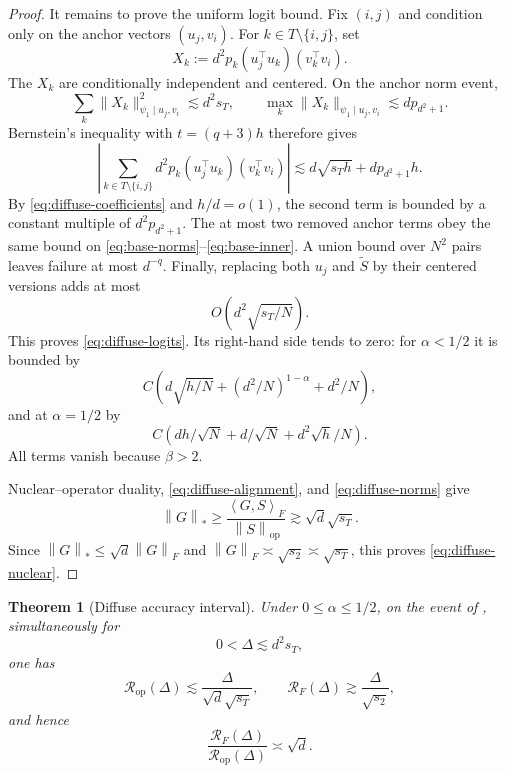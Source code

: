 \documentclass[11pt]{article}
\newtheorem{theorem}{Theorem}[section]
\theoremstyle{definition}
\newcommand{\ip}[2]{\left\langle #1,#2\right\rangle_F}
\newcommand{\normF}[1]{\left\lVert #1\right\rVert_F}
\newcommand{\normop}[1]{\left\lVert #1\right\rVert_{\mathrm{op}}}
\newcommand{\normnuc}[1]{\left\lVert #1\right\rVert_*}
\begin{document}
\begin{proof}
It remains to prove the uniform logit bound.  Fix $(i,j)$ and condition
only on the anchor vectors $(u_j,v_i)$.  For
$k\in T\setminus\{i,j\}$, set
\[
 X_k:=d^2p_k(u_j^\top u_k)(v_k^\top v_i).
\]
The $X_k$ are conditionally independent and centered.  On the anchor
norm event,
\[
 \sum_k\|X_k\|_{\psi_1\mid u_j,v_i}^2\lesssim d^2s_T,
 \qquad
 \max_k\|X_k\|_{\psi_1\mid u_j,v_i}
 \lesssim dp_{d^2+1}.
\]  Bernstein's
inequality with $t=(q+3)h$ therefore gives
\[
 \left|\sum_{k\in T\setminus\{i,j\}}
 d^2p_k(u_j^\top u_k)(v_k^\top v_i)\right|
 \lesssim d\sqrt{s_Th}+d p_{d^2+1}h.
\]
By \eqref{eq:diffuse-coefficients} and $h/d=o(1)$, the second term is
bounded by a constant multiple of $d^2p_{d^2+1}$.  The at most two
removed anchor terms obey the same bound on
\eqref{eq:base-norms}--\eqref{eq:base-inner}.  A union bound over
$N^2$ pairs leaves failure at most $d^{-q}$.  Finally, replacing both
$u_j$ and $\widetilde S$ by their centered versions adds at most
\[
 O\!\left(d^2\sqrt{s_T/N}\right).
\]
This proves \eqref{eq:diffuse-logits}.  Its right-hand side tends to zero:
for $\alpha<1/2$ it is bounded by
\[
 C\left(d\sqrt{h/N}+(d^2/N)^{1-\alpha}+d^2/N\right),
\]
and at $\alpha=1/2$ by
\[
 C\left(dh/\sqrt N+d/\sqrt N+d^2\sqrt h/N\right).
\]
All terms vanish because $\beta>2$.

Nuclear--operator duality, \eqref{eq:diffuse-alignment}, and
\eqref{eq:diffuse-norms} give
\[
 \normnuc{G}\geq
 \frac{\ip{G}{S}}{\normop{S}}
 \gtrsim\sqrt d\sqrt{s_T}.
\]
Since $\normnuc{G}\leq\sqrt d\normF{G}$ and
$\normF{G}\asymp\sqrt{s_2}\asymp\sqrt{s_T}$, this proves
\eqref{eq:diffuse-nuclear}.
\end{proof}

\begin{theorem}[Diffuse accuracy interval]
\label{thm:diffuse}
Under $0\leq\alpha\leq1/2$, on the event of
, simultaneously for
\begin{equation}
 0<\Delta\lesssim d^2s_T,
 \label{eq:diffuse-gain}
\end{equation}
one has
\begin{equation}
 \mathcal R_{\mathrm{op}}(\Delta)
 \lesssim\frac{\Delta}{\sqrt d\sqrt{s_T}},
 \qquad
 \mathcal R_F(\Delta)\gtrsim\frac{\Delta}{\sqrt{s_2}},
 \label{eq:diffuse-radii}
\end{equation}
and hence
\[
 \frac{\mathcal R_F(\Delta)}
 {\mathcal R_{\mathrm{op}}(\Delta)}\asymp\sqrt d.
\]
\end{theorem}
\end{document}
